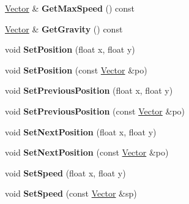 \begin{DoxyCompactItemize}
\item 
\hypertarget{classPhysicsState_a1079c9f799d7e34ffdfd8a4b5f9d2933}{\hyperlink{classVector}{Vector} \& {\bfseries Get\-Max\-Speed} () const }\label{classPhysicsState_a1079c9f799d7e34ffdfd8a4b5f9d2933}

\item 
\hypertarget{classPhysicsState_a6cd15a4f740f40df9dac18d49f866990}{\hyperlink{classVector}{Vector} \& {\bfseries Get\-Gravity} () const }\label{classPhysicsState_a6cd15a4f740f40df9dac18d49f866990}

\item 
\hypertarget{classPhysicsState_a17e92393aa3a4e8fa8a97a6deee715ac}{void {\bfseries Set\-Position} (float x, float y)}\label{classPhysicsState_a17e92393aa3a4e8fa8a97a6deee715ac}

\item 
\hypertarget{classPhysicsState_a2b8825de2bd08853af67e9935a5258ff}{void {\bfseries Set\-Position} (const \hyperlink{classVector}{Vector} \&po)}\label{classPhysicsState_a2b8825de2bd08853af67e9935a5258ff}

\item 
\hypertarget{classPhysicsState_ab30a0583043b5d865ceb8ce5208e4c14}{void {\bfseries Set\-Previous\-Position} (float x, float y)}\label{classPhysicsState_ab30a0583043b5d865ceb8ce5208e4c14}

\item 
\hypertarget{classPhysicsState_a14a264ebf9b2182c3e3a1657316eceb7}{void {\bfseries Set\-Previous\-Position} (const \hyperlink{classVector}{Vector} \&po)}\label{classPhysicsState_a14a264ebf9b2182c3e3a1657316eceb7}

\item 
\hypertarget{classPhysicsState_a2d070aeeb92df2ad43e26ba715ec709d}{void {\bfseries Set\-Next\-Position} (float x, float y)}\label{classPhysicsState_a2d070aeeb92df2ad43e26ba715ec709d}

\item 
\hypertarget{classPhysicsState_a09b12ce1cef123f811eb51432843e0a8}{void {\bfseries Set\-Next\-Position} (const \hyperlink{classVector}{Vector} \&po)}\label{classPhysicsState_a09b12ce1cef123f811eb51432843e0a8}

\item 
\hypertarget{classPhysicsState_aab2853866a84f1323374e7b976d8dd4e}{void {\bfseries Set\-Speed} (float x, float y)}\label{classPhysicsState_aab2853866a84f1323374e7b976d8dd4e}

\item 
\hypertarget{classPhysicsState_a74cab8c0a665ace226e0b1d0dc90eaf4}{void {\bfseries Set\-Speed} (const \hyperlink{classVector}{Vector} \&sp)}\label{classPhysicsState_a74cab8c0a665ace226e0b1d0dc90eaf4}


\end{DoxyCompactItemize}
